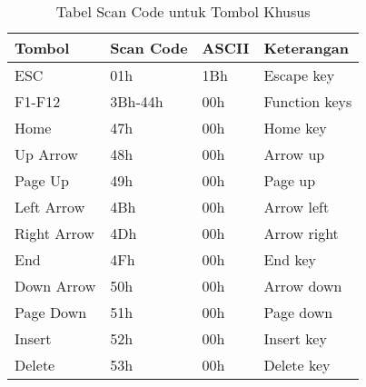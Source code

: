 \documentclass[../main.tex]{subfiles}
\begin{document}
\begin{table}[H]
    \centering
    \caption{Tabel Scan Code untuk Tombol Khusus}
    \begin{tabular}{|p{2cm}|p{2cm}|p{3cm}|p{6cm}|}
        \hline
        \textbf{Tombol} & \textbf{Scan Code} & \textbf{ASCII} & \textbf{Keterangan} \\
        \hline
        ESC & 01h & 1Bh & Escape key \\
        \hline
        F1-F12 & 3Bh-44h & 00h & Function keys \\
        \hline
        Home & 47h & 00h & Home key \\
        \hline
        Up Arrow & 48h & 00h & Arrow up \\
        \hline
        Page Up & 49h & 00h & Page up \\
        \hline
        Left Arrow & 4Bh & 00h & Arrow left \\
        \hline
        Right Arrow & 4Dh & 00h & Arrow right \\
        \hline
        End & 4Fh & 00h & End key \\
        \hline
        Down Arrow & 50h & 00h & Arrow down \\
        \hline
        Page Down & 51h & 00h & Page down \\
        \hline
        Insert & 52h & 00h & Insert key \\
        \hline
        Delete & 53h & 00h & Delete key \\
        \hline
    \end{tabular}
    \label{tab:scan-codes}
\end{table}
\end{document}
